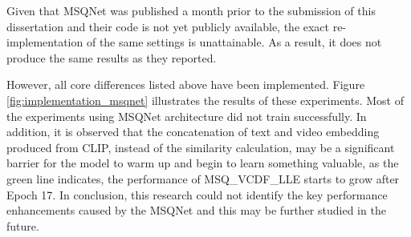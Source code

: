 Given that MSQNet was published a month prior to the submission of this dissertation and their code is not yet publicly available, the exact re-implementation of the same settings is unattainable. As a result, it does not produce the same results as they reported. 

However, all core differences listed above have been implemented. Figure \ref{fig:implementation_msqnet} illustrates the results of these experiments. Most of the experiments using MSQNet architecture did not train successfully. In addition, it is observed that the concatenation of text and video embedding produced from CLIP, instead of the similarity calculation, may be a significant barrier for the model to warm up and begin to learn something valuable, as the green line indicates, the performance of MSQ\_VCDF\_LLE starts to grow after Epoch 17. In conclusion, this research could not identify the key performance enhancements caused by the MSQNet and this may be further studied in the future.






